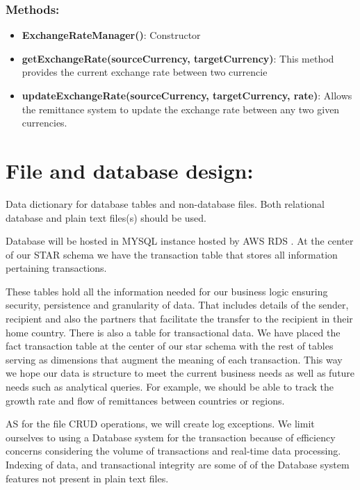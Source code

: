 \documentclass[onecolumn, letterpaper, ]{report}
\begin{document}
            \subsubsection{Methods:}
            \begin{itemize}
                \item \textbf{ ExchangeRateManager()}: Constructor
                \item \textbf{getExchangeRate(sourceCurrency, targetCurrency)}: This method provides the current exchange rate between two currencie
                \item \textbf{updateExchangeRate(sourceCurrency, targetCurrency, rate)}:  Allows the remittance system to update the exchange rate between any two given currencies. 
            \end{itemize}

    \section{\colorbox{white!95!black}{File and database design:}}
    Data dictionary for database tables and non-database files. Both relational database and plain text files(s) should be used.
    
        Database will be hosted in MYSQL instance hosted by AWS RDS . At the center of our STAR schema we have the transaction table that stores all information pertaining transactions.

        These tables hold all the information needed for our business logic ensuring security, persistence and granularity of data. That includes details of the sender, recipient and also the partners that facilitate the transfer to the recipient in their home country. There is also a table for transactional data. We have placed the fact transaction table at the center of our star schema with the rest of tables serving as dimensions that augment the meaning of each transaction. This way we hope our data is structure to meet the current business needs as well as future needs such as analytical queries. For example, we should be able to track the growth rate and flow of remittances between countries or regions.

        AS for the file CRUD operations, we will create log exceptions. We limit ourselves to using a Database system for the transaction because of efficiency concerns considering the volume of transactions and real-time data processing. Indexing of data, and transactional integrity are some of of the Database system features not present in plain text files. 
\end{document}
